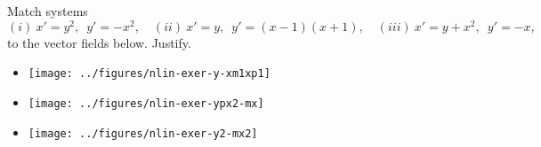 \documentclass{ximera}
\begin{document}
\begin{exercise}%
    Match systems
    \begin{equation*}
        (i)\  x'=y^2, \enspace y'=-x^2, \quad (ii)\  x'=y, \enspace y'=(x-1)(x+1), \quad (iii)\  x'=y+x^2, \enspace y'=-x,
    \end{equation*}
    to the vector fields below.  Justify.
    \begin{itemize}
        \item \parbox[c]{1.75in}{\texttt{[image: ../figures/nlin-exer-y-xm1xp1]}}
            \begin{multipleChoice}
            \end{multipleChoice}
        \item \parbox[c]{1.75in}{\texttt{[image: ../figures/nlin-exer-ypx2-mx]}}
            \begin{multipleChoice}
            \end{multipleChoice}
        \item \parbox[c]{1.75in}{\texttt{[image: ../figures/nlin-exer-y2-mx2]}}
            \begin{multipleChoice}
            \end{multipleChoice}
    \end{itemize}
\end{exercise}
\end{document}
